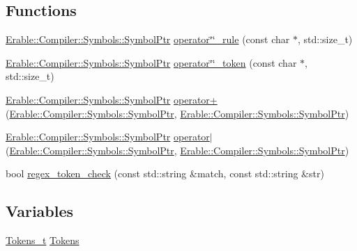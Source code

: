 \subsection*{Functions}
\begin{DoxyCompactItemize}
\item 
\mbox{\hyperlink{namespace_erable_1_1_compiler_1_1_symbols_a8f0bc762f448ea4d84e8713ab3e140b9}{Erable\+::\+Compiler\+::\+Symbols\+::\+Symbol\+Ptr}} \mbox{\hyperlink{namespace_erable_1_1_compiler_a52f9bdafa61786211189defd613c141f}{operator\char`\"{}\char`\"{}\+\_\+rule}} (const char $\ast$, std\+::size\+\_\+t)
\item 
\mbox{\hyperlink{namespace_erable_1_1_compiler_1_1_symbols_a8f0bc762f448ea4d84e8713ab3e140b9}{Erable\+::\+Compiler\+::\+Symbols\+::\+Symbol\+Ptr}} \mbox{\hyperlink{namespace_erable_1_1_compiler_a12e383814331039594edb91cc0b9ecd0}{operator\char`\"{}\char`\"{}\+\_\+token}} (const char $\ast$, std\+::size\+\_\+t)
\item 
\mbox{\hyperlink{namespace_erable_1_1_compiler_1_1_symbols_a8f0bc762f448ea4d84e8713ab3e140b9}{Erable\+::\+Compiler\+::\+Symbols\+::\+Symbol\+Ptr}} \mbox{\hyperlink{namespace_erable_1_1_compiler_ae3989a29a829966e863310ccf942e128}{operator+}} (\mbox{\hyperlink{namespace_erable_1_1_compiler_1_1_symbols_a8f0bc762f448ea4d84e8713ab3e140b9}{Erable\+::\+Compiler\+::\+Symbols\+::\+Symbol\+Ptr}}, \mbox{\hyperlink{namespace_erable_1_1_compiler_1_1_symbols_a8f0bc762f448ea4d84e8713ab3e140b9}{Erable\+::\+Compiler\+::\+Symbols\+::\+Symbol\+Ptr}})
\item 
\mbox{\hyperlink{namespace_erable_1_1_compiler_1_1_symbols_a8f0bc762f448ea4d84e8713ab3e140b9}{Erable\+::\+Compiler\+::\+Symbols\+::\+Symbol\+Ptr}} \mbox{\hyperlink{namespace_erable_1_1_compiler_a7af462659475f38d9927b98d7a492ed5}{operator$\vert$}} (\mbox{\hyperlink{namespace_erable_1_1_compiler_1_1_symbols_a8f0bc762f448ea4d84e8713ab3e140b9}{Erable\+::\+Compiler\+::\+Symbols\+::\+Symbol\+Ptr}}, \mbox{\hyperlink{namespace_erable_1_1_compiler_1_1_symbols_a8f0bc762f448ea4d84e8713ab3e140b9}{Erable\+::\+Compiler\+::\+Symbols\+::\+Symbol\+Ptr}})
\item 
bool \mbox{\hyperlink{namespace_erable_1_1_compiler_a2c50de6598a6601138e95a5674740f7a}{regex\+\_\+token\+\_\+check}} (const std\+::string \&match, const std\+::string \&str)
\end{DoxyCompactItemize}
\subsection*{Variables}
\begin{DoxyCompactItemize}
\item 
\mbox{\hyperlink{class_erable_1_1_compiler_1_1_tokens__t}{Tokens\+\_\+t}} \mbox{\hyperlink{namespace_erable_1_1_compiler_a6b3163502e436c7fe366b412429d8619}{Tokens}}
\end{DoxyCompactItemize}


